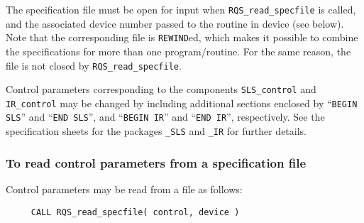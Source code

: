 \documentclass{galahad}
\newcommand{\packagename}{RQS}
\begin{document}
The specification file must be open for
input when {\tt \packagename\_read\_specfile}
is called, and the associated device number
passed to the routine in device (see below).
Note that the corresponding
file is {\tt REWIND}ed, which makes it possible to combine the specifications
for more than one program/routine.  For the same reason, the file is not
closed by {\tt \packagename\_read\_specfile}.

Control parameters corresponding to the components
{\tt SLS\_control}
and
{\tt IR\_control} may be changed by including additional sections enclosed by
``{\tt BEGIN SLS}'' and
``{\tt END SLS}'', and
``{\tt BEGIN IR}'' and
``{\tt END IR}'', respectively.
See the specification sheets for the packages
{\tt \libraryname\_SLS}
and
{\tt \libraryname\_IR}
for further details.

\subsubsection{To read control parameters from a specification file}
\label{readspec}

Control parameters may be read from a file as follows:
\hskip0.5in
\def\baselinestretch{0.8} {\tt \begin{verbatim}
     CALL RQS_read_specfile( control, device )
\end{verbatim}}
\def\baselinestretch{1.0}
\end{document}
